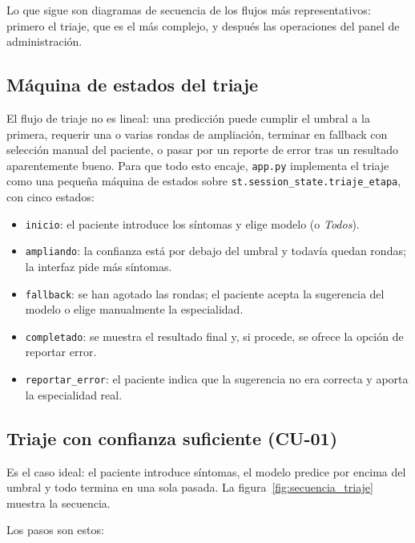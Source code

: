 Lo que sigue son diagramas de secuencia de los flujos más representativos: primero el triaje, que es el más complejo, y después las operaciones del panel de administración.

\subsection*{Máquina de estados del triaje}

El flujo de triaje no es lineal: una predicción puede cumplir el umbral a la primera, requerir una o varias rondas de ampliación, terminar en fallback con selección manual del paciente, o pasar por un reporte de error tras un resultado aparentemente bueno. Para que todo esto encaje, \texttt{app.py} implementa el triaje como una pequeña máquina de estados sobre \texttt{st.session\_state.triaje\_etapa}, con cinco estados:

\begin{itemize}
	\item \texttt{inicio}: el paciente introduce los síntomas y elige modelo (o \textit{Todos}).
	\item \texttt{ampliando}: la confianza está por debajo del umbral y todavía quedan rondas; la interfaz pide más síntomas.
	\item \texttt{fallback}: se han agotado las rondas; el paciente acepta la sugerencia del modelo o elige manualmente la especialidad.
	\item \texttt{completado}: se muestra el resultado final y, si procede, se ofrece la opción de reportar error.
	\item \texttt{reportar\_error}: el paciente indica que la sugerencia no era correcta y aporta la especialidad real.
\end{itemize}

\subsection*{Triaje con confianza suficiente (CU-01)}

Es el caso ideal: el paciente introduce síntomas, el modelo predice por encima del umbral y todo termina en una sola pasada. La figura~\ref{fig:secuencia_triaje} muestra la secuencia.

Los pasos son estos:

